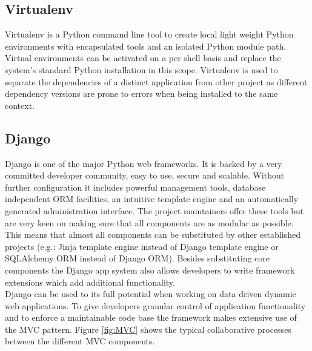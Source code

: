 \documentclass[BachelorPaper]{subfiles}
\begin{document}


\subsection{Virtualenv}
\label{subsec:mat_virtualenv}
Virtualenv is a Python command line tool to create local light weight Python environments with encapsulated tools and an isolated Python module path. Virtual environments can be activated on a per shell basis and replace the system's standard Python installation in this scope. Virtualenv is used to separate the dependencies of a distinct application from other project as different dependency versions are prone to errors when being installed to the same context.

\subsection{Django}
\label{subsec:mat_django}
Django is one of the major Python web frameworks. It is backed by a very committed developer community, easy to use, secure and scalable. Without further configuration it includes powerful management tools, database independent \ac{ORM} facilities, an intuitive template engine and an automatically generated administration interface. The project maintainers offer these tools but are very keen on making sure that all components are as modular as possible. This means that almost all components can be substituted by other established projects (e.g.: Jinja template engine instead of Django template engine or SQLAlchemy \ac{ORM} instead of Django \ac{ORM}). Besides substituting core components the Django app system also allows developers to write framework extensions which add additional functionality.\\

Django can be used to its full potential when working on data driven dynamic web applications. To give developers granular control of application functionality and to enforce a maintainable code base the framework makes extensive use of the \ac{MVC} pattern. Figure \ref{fig:MVC} shows the typical collaborative processes between the different \ac{MVC} components.
\end{document}
